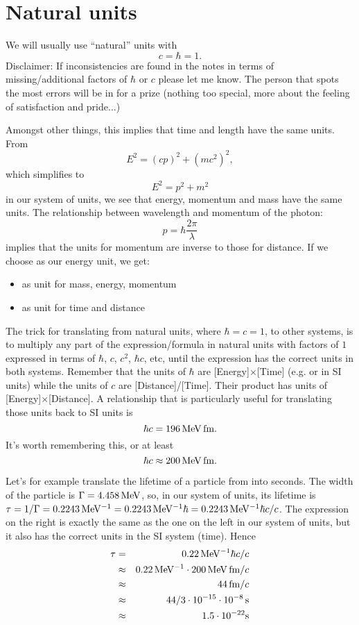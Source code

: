 \section{Natural units}
\label{sec:naturalUnits}
We will usually use ``natural'' units with 
\[
c=\hbar=1.
\]
 Disclaimer: If inconsistencies are found in the notes in terms of missing/additional
 factors of $\hbar$ or $c$ please let me know. The person that spots the most errors
 will be in for a prize (nothing too special, more about the 
 feeling of satisfaction and pride...) 
 
 Amongst other things, this implies that time and length have the same
 units. From
\[
  E^2 = (cp)^2 + (mc^2)^2,
\]
 which simplifies to
\[
  E^2 = p^2 + m^2
\]
 in our system of units, we see that energy, momentum and mass
 have the same units. The relationship between wavelength and
 momentum of the photon:
\[
   p = \hbar \frac{2\pi}{\lambda}
\]
 implies that the units for momentum are inverse to those for
 distance. If we choose  as our energy unit, we get:
\begin{itemize}
  \item {} as unit for mass, energy, momentum
  \item {} as unit for time and distance
\end{itemize}

The trick for translating from natural units, where $\hbar=c=1$, to
other systems, is to multiply any part of the expression/formula in
natural units with factors of $1$ expressed in terms of $\hbar$, $c$,
$c^2$, $\hbar c$, etc, until the expression has the correct units in
both systems. Remember that the units of $\hbar$ are [Energy]$\times$[Time] (e.g.  or  in SI units) while the units of $c$ are [Distance]/[Time]. Their product has units of [Energy]$\times$[Distance]. A relationship that is particularly useful for translating those units back to SI
 units is
\[
  \hbar c = 196\,\mathrm{MeV\,fm}.
\]
It's worth remembering this, or at least
\[
  \hbar c \approx 200\,\mathrm{MeV\,fm}.
\]

Let's for example translate the lifetime of a particle
from  into seconds. The width of the \prt{\phi} particle is
$\Gamma = 4.458\,\mathrm{MeV}$, so, in our system of units, its lifetime
is $\tau = 1/\Gamma=0.2243\,\mathrm{MeV^{-1}} =0.2243\,\mathrm{MeV^{-1}} \hbar
= 0.2243\,\mathrm{MeV^{-1}} \hbar c/c$. The expression on the right is
exactly the same as the one on the left in our system of units, but it
also has the correct units in the SI system (time). Hence
 \begin{eqnarray*}
\tau &=&       0.22\,\mathrm{MeV^{-1}} \hbar c/c                 \\
     &\approx& 0.22\,\mathrm{MeV^{-1}} \cdot 200\,\mathrm{MeV\,fm} /c      \\
     &\approx&       44\,\mathrm{fm} /c                                \\
     &\approx& 44/3 \cdot 10^{-15}\cdot 10^{-8}\,\mathrm{s}  \\
     &\approx&        1.5 \cdot 10^{-22} \mathrm{s}
\end{eqnarray*}

